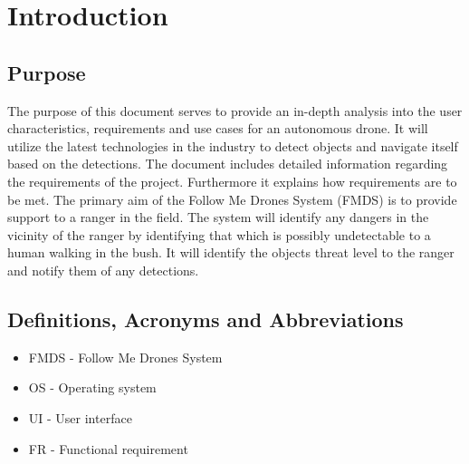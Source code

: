 \chapter{Introduction}
\section{Purpose}
\begin{flushleft}
	The purpose of this document serves to provide an in-depth analysis into the user characteristics, requirements and use cases for an autonomous drone. 
	It will utilize the latest technologies in the industry to detect objects and navigate itself based on the detections. 
	The document includes detailed information regarding the requirements of the project.
	Furthermore it explains how requirements are to be met.
	\newline
	\newline
	The primary aim of the Follow Me Drones System (FMDS) is to provide support to a ranger in the field. The system will identify any dangers in the vicinity 
	of the ranger by identifying that which is possibly undetectable to a human walking in the bush. It will identify the objects threat level to the ranger and notify them of any detections. 
\end{flushleft}

\section{Definitions, Acronyms and Abbreviations}

\begin{itemize}
	\item FMDS - Follow Me Drones System
	\item OS - Operating system
	\item UI - User interface
	\item FR - Functional requirement
\end{itemize}

